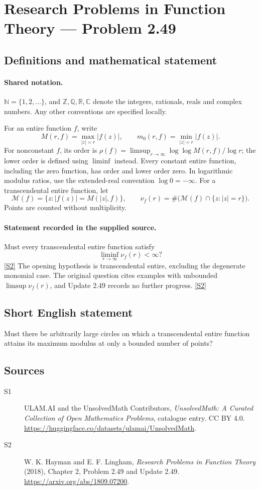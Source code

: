 \documentclass[11pt]{article}
\newcommand{\sref}[2]{\hyperlink{source:#1:#2}{[S#2]}}
\begin{document}
\section{Research Problems in Function Theory — Problem 2.49}\label{statement}

\subsection{Definitions and mathematical statement}

\paragraph{Shared notation.}$\mathbb N=\{1,2,\ldots\}$, and $\mathbb Z,\mathbb Q,\mathbb R,\mathbb C$ denote the integers, rationals, reals and complex numbers. Any other conventions are specified locally.


For an entire function $f$, write
\[
 M(r,f)=\max_{|z|=r}|f(z)|,\qquad m_0(r,f)=\min_{|z|=r}|f(z)|.
\]
For nonconstant $f$, its order is $\rho(f)=\limsup_{r\to\infty}\log\log M(r,f)/\log r$;
the lower order is defined using $\liminf$ instead. Every constant entire function, including the zero function, has order and lower order zero. In logarithmic modulus ratios, use the extended-real convention $\log0=-\infty$.
For a transcendental entire function, let
\[\mathcal M(f)=\{z:|f(z)|=M(|z|,f)\},\qquad
\nu_f(r)=\#\bigl(\mathcal M(f)\cap\{z:|z|=r\}\bigr).
\]
Points are counted without multiplicity.

\paragraph{Statement recorded in the supplied source.}
Must every transcendental entire function satisfy
\[\liminf_{r\to\infty}\nu_f(r)<\infty?\] \sref{statement}{2}
The opening hypothesis is transcendental entire, excluding the degenerate monomial case. The original question cites examples with unbounded $\limsup\nu_f(r)$, and Update 2.49 records no further progress. \sref{statement}{2}
\subsection{Short English statement}
Must there be arbitrarily large circles on which a transcendental entire function attains its maximum modulus at only a bounded number of points?
\subsection{Sources}
\begin{description}
\item[\hypertarget{source:statement:1}{S1}] ULAM.AI and the UnsolvedMath Contributors, \emph{UnsolvedMath: A Curated Collection of Open Mathematics Problems}, catalogue entry. CC BY 4.0. \url{https://huggingface.co/datasets/ulamai/UnsolvedMath}.
\item[\hypertarget{source:statement:2}{S2}] W. K. Hayman and E. F. Lingham, \emph{Research Problems in Function Theory} (2018), Chapter 2, Problem 2.49 and Update 2.49. \url{https://arxiv.org/abs/1809.07200}.
\end{description}
\label{end:statement}
\end{document}
